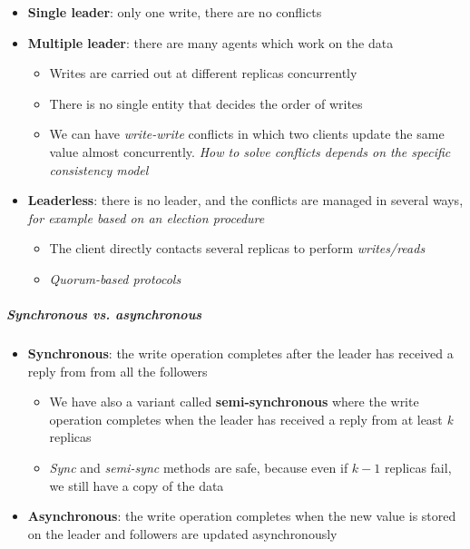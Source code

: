 \begin{itemize}
    \item
      \textbf{Single leader}: only one write, there are no conflicts
      
    \item
      \textbf{Multiple leader}: there are many agents which work on the data
    \begin{itemize}
        \item
          Writes are carried out at different replicas concurrently
        \item
          There is no single entity that decides the order of writes
        \item
          We can have \emph{write-write} conflicts in which two clients update
          the same value almost concurrently. \emph{How to solve conflicts
          depends on the specific consistency model}
    \end{itemize}
    
    \item
      \textbf{Leaderless}: there is no leader, and the conflicts are managed
      in several ways, \emph{for example based on an election procedure}
    \begin{itemize}
        \item
          The client directly contacts several replicas to perform
          \emph{writes/reads}
        \item
          \emph{Quorum-based protocols}
    \end{itemize}
\end{itemize}

\subparagraph{Synchronous vs. asynchronous}

\begin{itemize}
    \item
      \textbf{Synchronous}: the write operation completes after the leader
      has received a reply from from all the followers
    \begin{itemize}
        \item
          We have also a variant called \textbf{semi-synchronous} where the
          write operation completes when the leader has received a reply from at
          least \emph{k} replicas
        \item
          \emph{Sync} and \emph{semi-sync} methods are safe, because even if
          $k-1$ replicas fail, we still have a copy of the data
    \end{itemize}
    
    \item
      \textbf{Asynchronous}: the write operation completes when the new
      value is stored on the leader and followers are updated asynchronously
\end{itemize}

